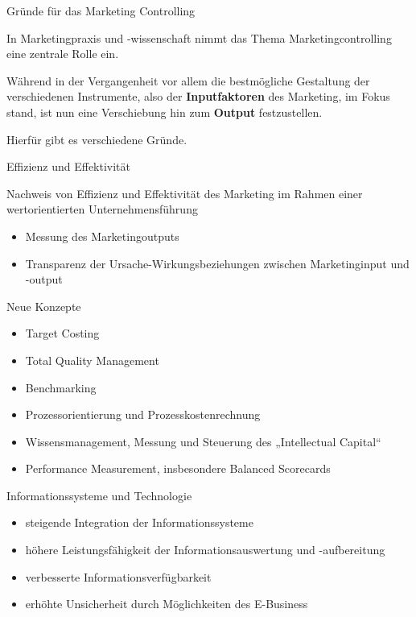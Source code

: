 \documentclass[12pt,ngerman,a4paper,ignorenonframetext,]{beamer}
\providecommand{\tightlist}{%
  \setlength{\itemsep}{0pt}\setlength{\parskip}{0pt}}
\begin{document}
\begin{frame}{Gründe für das Marketing Controlling}
\protect\hypertarget{grunde-fur-das-marketing-controlling}{}

In Marketingpraxis und -wissenschaft nimmt das Thema
Marketingcontrolling eine zentrale Rolle ein.

Während in der Vergangenheit vor allem die bestmögliche Gestaltung der
verschiedenen Instrumente, also der \textbf{Inputfaktoren} des
Marketing, im Fokus stand, ist nun eine Verschiebung hin zum
\textbf{Output} festzustellen.

Hierfür gibt es verschiedene Gründe.

\end{frame}

\begin{frame}{Effizienz und Effektivität}
\protect\hypertarget{effizienz-und-effektivitat}{}

Nachweis von Effizienz und Effektivität des Marketing im Rahmen einer
wertorientierten Unternehmensführung

\begin{itemize}
\tightlist
\item
  Messung des Marketingoutputs
\item
  Transparenz der Ursache-Wirkungsbeziehungen zwischen Marketinginput
  und -output
\end{itemize}

\end{frame}

\begin{frame}{Neue Konzepte}
\protect\hypertarget{neue-konzepte}{}

\begin{itemize}
\tightlist
\item
  Target Costing
\item
  Total Quality Management
\item
  Benchmarking
\item
  Prozessorientierung und Prozesskostenrechnung
\item
  Wissensmanagement, Messung und Steuerung des „Intellectual Capital``
\item
  Performance Measurement, insbesondere Balanced Scorecards
\end{itemize}

\end{frame}

\begin{frame}{Informationssysteme und Technologie}
\protect\hypertarget{informationssysteme-und-technologie}{}

\begin{itemize}
\tightlist
\item
  steigende Integration der Informationssysteme
\item
  höhere Leistungsfähigkeit der Informationsauswertung und -aufbereitung
\item
  verbesserte Informationsverfügbarkeit
\item
  erhöhte Unsicherheit durch Möglichkeiten des E-Business
\end{itemize}

\end{frame}
\end{document}
